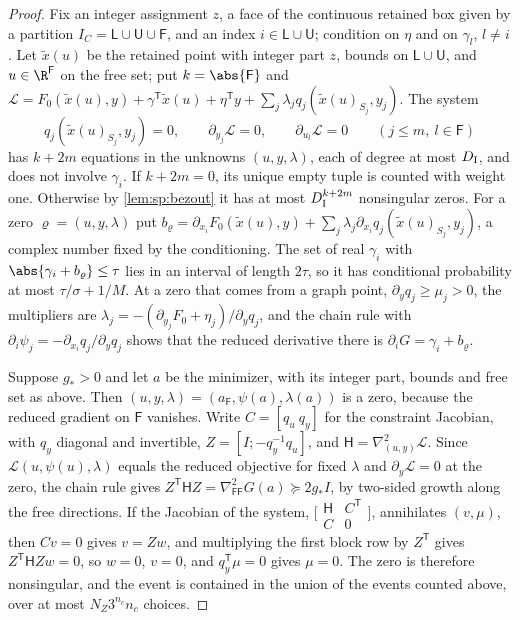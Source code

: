\begin{proof}
Fix an integer assignment $z$, a face of the continuous retained box given by
a partition $I_C=\mathsf L\cup\mathsf U\cup\mathsf F$, and an index
$i\in\mathsf L\cup\mathsf U$; condition on $\eta$ and on $\gamma_l$, $l\ne i$.
Let $\tilde x(u)$ be the retained point with integer part $z$, bounds on
$\mathsf L\cup\mathsf U$, and $u\in\R^{\mathsf F}$ on the free set; put
$k=\abs{\mathsf F}$ and $\mathcal L=F_0(\tilde x(u),y)+\gamma^{\mathsf
T}\tilde x(u)+\eta^{\mathsf T}y+\sum_j\lambda_jq_j(\tilde x(u)_{S_j},y_j)$.
The system
\[
 q_j(\tilde x(u)_{S_j},y_j)=0,\qquad \partial_{y_j}\mathcal L=0,\qquad
 \partial_{u_l}\mathcal L=0\qquad(j\le m,\ l\in\mathsf F)
\]
has $k+2m$ equations in the unknowns $(u,y,\lambda)$, each of degree at most
$D_{\rm I}$, and does not involve $\gamma_i$. If $k+2m=0$, its unique
empty tuple is counted with weight one. Otherwise by \cref{lem:sp:bezout} it has at
most $D_{\rm I}^{k+2m}$ nonsingular zeros. For a zero $\varrho=(u,y,\lambda)$ put
$b_\varrho=\partial_{x_i}F_0(\tilde x(u),y)+\sum_j\lambda_j\partial_{x_i}q_j(\tilde
x(u)_{S_j},y_j)$, a complex number fixed by the conditioning. The set of real
$\gamma_i$ with $\abs{\gamma_i+b_\varrho}\le\tau$ lies in an interval of length
$2\tau$, so it has conditional probability at most $\tau/\sigma+1/M$. At a zero
that comes from a graph point, $\partial_yq_j\ge\mu_j>0$, the multipliers are
$\lambda_j=-(\partial_{y_j}F_0+\eta_j)/\partial_yq_j$, and the chain rule with
$\partial_i\psi_j=-\partial_{x_i}q_j/\partial_yq_j$ shows that the reduced
derivative there is $\partial_iG=\gamma_i+b_\varrho$.

Suppose $g_*>0$ and let $a$ be the minimizer, with its integer part, bounds
and free set as above. Then $(u,y,\lambda)=(a_{\mathsf F},\psi(a),\lambda(a))$
is a zero, because the reduced gradient on $\mathsf F$ vanishes. Write
$C=[q_u\ q_y]$ for the constraint Jacobian, with $q_y$ diagonal and
invertible, $Z=[I;-q_y^{-1}q_u]$, and $\mathsf H=\nabla^2_{(u,y)}\mathcal L$.
Since $\mathcal L(u,\psi(u),\lambda)$ equals the reduced objective for fixed
$\lambda$ and $\partial_y\mathcal L=0$ at the zero, the chain rule gives
$Z^{\mathsf T}\mathsf HZ=\nabla^2_{\mathsf F\mathsf F}G(a)\succeq2g_*I$, by
two-sided growth along the free directions. If the Jacobian of the system,
$\bigl[\begin{smallmatrix}\mathsf H&C^{\mathsf T}\\C&0\end{smallmatrix}\bigr]$,
annihilates $(v,\mu)$, then $Cv=0$ gives $v=Zw$, and multiplying the first
block row by $Z^{\mathsf T}$ gives $Z^{\mathsf T}\mathsf HZw=0$, so $w=0$, $v=0$,
and $q_y^{\mathsf T}\mu=0$ gives $\mu=0$. The zero is therefore nonsingular,
and the event is contained in the union of the events counted above, over at
most $N_Z3^{n_c}n_c$ choices.
\end{proof}

